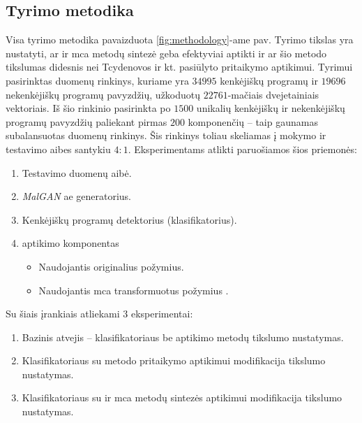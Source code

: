 
\subsection{Tyrimo metodika}

Visa tyrimo metodika pavaizduota \ref{fig:methodology}-ame pav. Tyrimo tikslas yra nustatyti, ar \LIME ir \gls{mca} metodų sintezė geba efektyviai aptikti  ir ar šio metodo tikslumas didesnis nei Tcydenovos ir kt. pasiūlyto \LIME pritaikymo  aptikimui. Tyrimui pasirinktas \SLEIPNIR \cite{al-dujailiAdversarialDeepLearning2018} duomenų rinkinys, kuriame yra $34995$ kenkėjiškų programų ir $19696$ nekenkėjiškų programų pavyzdžių, užkoduotų $22761$-mačiais dvejetainiais vektoriais. Iš šio rinkinio pasirinkta po $1500$ unikalių kenkėjiškų ir nekenkėjiškų programų pavyzdžių paliekant pirmas $200$ komponenčių -- taip gaunamas subalansuotas duomenų rinkinys. Šis rinkinys toliau skeliamas į mokymo ir testavimo aibes santykiu $4:1$. Eksperimentams atlikti paruošiamos šios priemonės:
\begin{enumerate}
    \item Testavimo duomenų aibė.
    \item \textit{MalGAN} \cite{huGeneratingAdversarialMalware2017} \gls{ae} generatorius.
    \item Kenkėjiškų programų detektorius (klasifikatorius).
    \item {} aptikimo komponentas
    \begin{itemize}
        \item Naudojantis originalius požymius.
        \item Naudojantis \gls{mca} transformuotus požymius .
    \end{itemize}
\end{enumerate}

Su šiais įrankiais atliekami 3 eksperimentai:
\begin{enumerate}
    \item Bazinis atvejis -- klasifikatoriaus be  aptikimo metodų tikslumo nustatymas.
    \item Klasifikatoriaus su \LIME metodo pritaikymo  aptikimui modifikacija tikslumo nustatymas.
    \item Klasifikatoriaus su \LIME ir \gls{mca} metodų sintezės  aptikimui modifikacija tikslumo nustatymas.
\end{enumerate}


